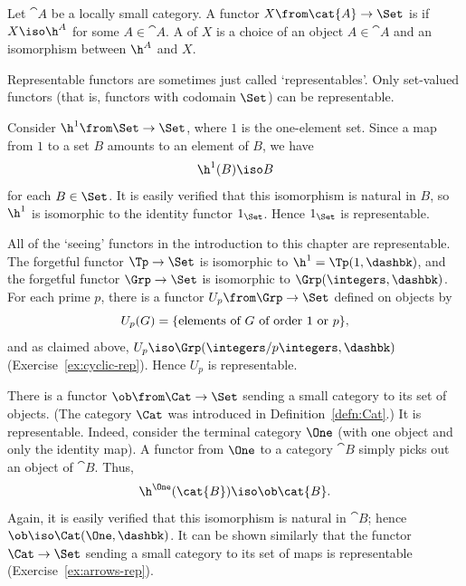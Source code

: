 \begin{defn}
Let $\cat{A}$ be a locally small category.  A functor $X\from \cat{A} \to
\Set$ is %
%
%
if $X \iso \h^A$ for some $A \in \cat{A}$.
A %
%
%
of $X$ is a choice of an object $A \in \cat{A}$ and an isomorphism between
$\h^A$ and $X$.
\end{defn}
% 
Representable functors are sometimes just called `representables'.  Only
set-valued%
%
%
%
functors (that is, functors with codomain $\Set$) can be representable.

\begin{example}        
\label{eg:co-reps-id-Set}
Consider $\h^1\from \Set \to \Set$, where $1$ is the one-element set.
Since a map from $1$ to a set $B$ amounts to an element of $B$, we have
\[
\h^1(B) \iso B
\]
for each $B \in \Set$.  It is easily verified that this isomorphism is
natural in $B$, so $\h^1$ is isomorphic to the identity functor $1_\Set$.
Hence $1_\Set$ is representable.
\end{example}

\begin{example}
\label{eg:co-reps-seeing}
All of the `seeing'%
%
%
functors in the introduction to this chapter are representable.  The
forgetful%
%
%
functor $\Tp \to \Set$ is isomorphic to $\h^1 = \Tp(1, \dashbk)$, and the
forgetful functor $\Grp \to \Set$ is isomorphic to $\Grp(\integers,
\dashbk)$.  For each prime $p$, there is a functor $U_p\from \Grp \to \Set$
defined on objects by
\[
U_p(G) = 
\{\text{elements of }G \text{ of order } 1 \text{ or } p \},
%
\index{group!order of element of}
%
\]
and as claimed above, $U_p \iso \Grp(\integers/p\integers, \dashbk)$
(Exercise~\ref{ex:cyclic-rep}).  Hence $U_p$ is representable.
\end{example}

\begin{example}
There is a functor $\ob\from \Cat \to \Set$ sending a small category to its
set%
%
% 
of objects.  (The category $\Cat$ was introduced in
Definition~\ref{defn:Cat}.) It is representable.  Indeed, consider the
terminal category $\One$ (with one object and only the identity map).  A
functor from $\One$ to a category $\cat{B}$ simply picks out an object of
$\cat{B}$.  Thus,
\[
\h^\One(\cat{B}) \iso \ob\cat{B}.
\]
Again, it is easily verified that this isomorphism is natural in $\cat{B}$;
hence $\ob \iso \Cat(\One, \dashbk)$.  It can be shown similarly that the
functor $\Cat \to \Set$ sending a small category to its set of maps is
representable (Exercise~\ref{ex:arrows-rep}).  
\end{example}

